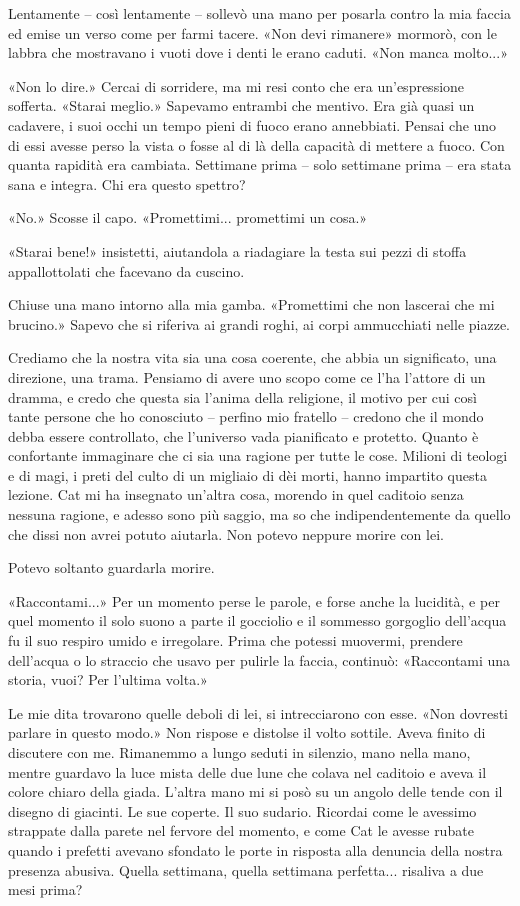 Lentamente -- così lentamente -- sollevò una mano per posarla contro la
mia faccia ed emise un verso come per farmi tacere. «Non devi rimanere»
mormorò, con le labbra che mostravano i vuoti dove i denti le erano
caduti. «Non manca molto...»

«Non lo dire.» Cercai di sorridere, ma mi resi conto che era
un'espressione sofferta. «Starai meglio.» Sapevamo entrambi che mentivo.
Era già quasi un cadavere, i suoi occhi un tempo pieni di fuoco erano
annebbiati. Pensai che uno di essi avesse perso la vista o fosse al di
là della capacità di mettere a fuoco. Con quanta rapidità era cambiata.
Settimane prima -- solo settimane prima -- era stata sana e integra. Chi
era questo spettro?

«No.» Scosse il capo. «Promettimi... promettimi un cosa.»

«Starai bene!» insistetti, aiutandola a riadagiare la testa sui pezzi di
stoffa appallottolati che facevano da cuscino.

Chiuse una mano intorno alla mia gamba. «Promettimi che non lascerai che
mi brucino.» Sapevo che si riferiva ai grandi roghi, ai corpi
ammucchiati nelle piazze.

Crediamo che la nostra vita sia una cosa coerente, che abbia un
significato, una direzione, una trama. Pensiamo di avere uno scopo come
ce l'ha l'attore di un dramma, e credo che questa sia l'anima della
religione, il motivo per cui così tante persone che ho conosciuto --
perfino mio fratello -- credono che il mondo debba essere controllato,
che l'universo vada pianificato e protetto. Quanto è confortante
immaginare che ci sia una ragione per tutte le cose. Milioni di teologi
e di magi, i preti del culto di un migliaio di dèi morti, hanno
impartito questa lezione. Cat mi ha insegnato un'altra cosa, morendo in
quel caditoio senza nessuna ragione, e adesso sono più saggio, ma so che
indipendentemente da quello che dissi non avrei potuto aiutarla. Non
potevo neppure morire con lei.

Potevo soltanto guardarla morire.

«Raccontami...» Per un momento perse le parole, e forse anche la
lucidità, e per quel momento il solo suono a parte il gocciolio e il
sommesso gorgoglio dell'acqua fu il suo respiro umido e irregolare.
Prima che potessi muovermi, prendere dell'acqua o lo straccio che usavo
per pulirle la faccia, continuò: «Raccontami una storia, vuoi? Per
l'ultima volta.»

Le mie dita trovarono quelle deboli di lei, si intrecciarono con esse.
«Non dovresti parlare in questo modo.» Non rispose e distolse il volto
sottile. Aveva finito di discutere con me. Rimanemmo a lungo seduti in
silenzio, mano nella mano, mentre guardavo la luce mista delle due lune
che colava nel caditoio e aveva il colore chiaro della giada. L'altra
mano mi si posò su un angolo delle tende con il disegno di giacinti. Le
sue coperte. Il suo sudario. Ricordai come le avessimo strappate dalla
parete nel fervore del momento, e come Cat le avesse rubate quando i
prefetti avevano sfondato le porte in risposta alla denuncia della
nostra presenza abusiva. Quella settimana, quella settimana perfetta...
risaliva a due mesi prima?

